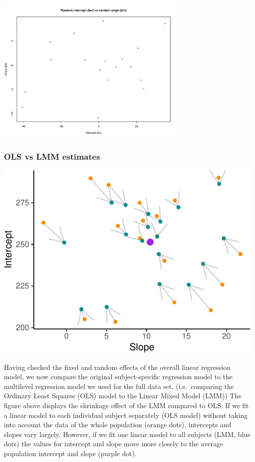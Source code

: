 \documentclass[
]{article}
\begin{document}
\begin{center}
\includegraphics[width=0.7\textwidth]{common_sleep_files/figure-latex/Random_int_vs_rand_slope.pdf}
\end{center}
\hypertarget{ols-vs-lmm-estimates}{%
\subsubsection{OLS vs LMM estimates}\label{ols-vs-lmm-estimates}}


\begin{center}\includegraphics{common_sleep_files/figure-latex/unnamed-chunk-9-1} \end{center}


Having checked the fixed and random effects of the overall linear
regression model, we now compare the original subject-specific
regression model to the multilevel regression model we used for the full
data set. (i.e.~comparing the Ordinary Least Squares (OLS) model to the
Linear Mixed Model (LMM))
The figure above displays the shrinkage effect of the LMM compared to OLS. If we
fit a linear model to each individual subject separately (OLS model)
without taking into account the data of the whole population (orange
dots), intercepts and slopes vary largely. However, if we fit one linear
model to all subjects (LMM, blue dots) the values for intercept and
slope move more closely to the average population intercept and slope
(purple dot).
\end{document}
